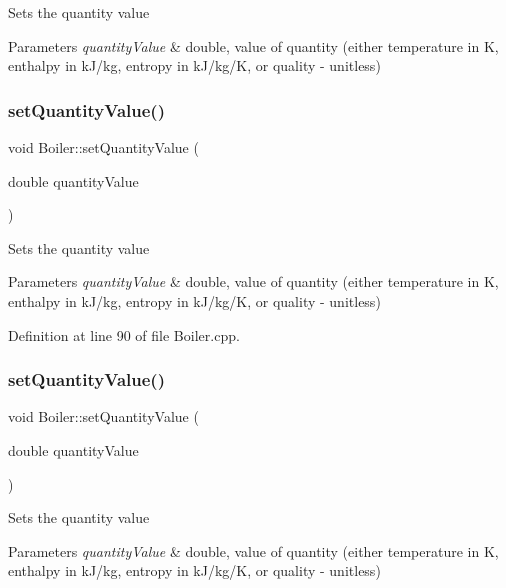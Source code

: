 Sets the quantity value 
\begin{DoxyParams}{Parameters}
{\em quantity\+Value} & double, value of quantity (either temperature in K, enthalpy in k\+J/kg, entropy in k\+J/kg/K, or quality -\/ unitless) \\
\hline
\end{DoxyParams}
\mbox{\label{class_boiler_ac3450d88dba124529d59baf62c39e14a}} 
\subsubsection{\texorpdfstring{set\+Quantity\+Value()}{setQuantityValue()}\hspace{0.1cm}{\footnotesize\ttfamily [2/3]}}
{\footnotesize\ttfamily void Boiler\+::set\+Quantity\+Value (\begin{DoxyParamCaption}\item[{double}]{quantity\+Value }\end{DoxyParamCaption})}

Sets the quantity value 
\begin{DoxyParams}{Parameters}
{\em quantity\+Value} & double, value of quantity (either temperature in K, enthalpy in k\+J/kg, entropy in k\+J/kg/K, or quality -\/ unitless) \\
\hline
\end{DoxyParams}


Definition at line 90 of file Boiler.\+cpp.

\mbox{\label{class_boiler_ac3450d88dba124529d59baf62c39e14a}} 
\subsubsection{\texorpdfstring{set\+Quantity\+Value()}{setQuantityValue()}\hspace{0.1cm}{\footnotesize\ttfamily [3/3]}}
{\footnotesize\ttfamily void Boiler\+::set\+Quantity\+Value (\begin{DoxyParamCaption}\item[{double}]{quantity\+Value }\end{DoxyParamCaption})}

Sets the quantity value 
\begin{DoxyParams}{Parameters}
{\em quantity\+Value} & double, value of quantity (either temperature in K, enthalpy in k\+J/kg, entropy in k\+J/kg/K, or quality -\/ unitless) \\
\hline
\end{DoxyParams}
\mbox{\label{class_boiler_ada7af5896a2a4701d78a532dc9bc9892}} 
